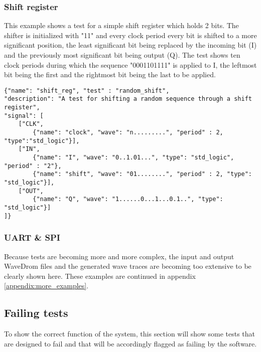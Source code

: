 \subsubsection{Shift register}\label{example:shift}
This example shows a test for a simple shift register which holds 2 bits. The shifter is initialized with "11" and every clock period every bit is shifted to a more significant position, the least significant bit being replaced by the incoming bit (I) and the previously most significant bit being output (Q). The test shows ten clock periods during which the sequence "0001101111" is applied to I, the leftmost bit being the first and the rightmost bit being the last to be applied.
\begin{lstlisting}[style=json, caption={Functionality test for the shifter design in appendix \ref{appendix:shifter}}, label={json:shifter_result}]
{"name": "shift_reg", "test" : "random_shift", 
"description": "A test for shifting a random sequence through a shift register", 
"signal": [
	["CLK",
		{"name": "clock", "wave": "n.........", "period" : 2, "type":"std_logic"}],
	["IN",
		{"name": "I", "wave": "0..1.01...", "type": "std_logic", "period" : "2"},
		{"name": "shift", "wave": "01........", "period" : 2, "type": "std_logic"}],
	["OUT",
		{"name": "Q", "wave": "1......0...1...0.1..", "type": "std_logic"}]
]}
\end{lstlisting}
\subsubsection{UART \& SPI}
Because tests are becoming more and more complex, the input and output WaveDrom files and the generated wave traces are becoming too extensive to be clearly shown here. These examples are continued in appendix \ref{appendix:more_examples}.
\subsection{Failing tests}
To show the correct function of the system, this section will show some tests that are designed to fail and that will be accordingly flagged as failing by the software.
